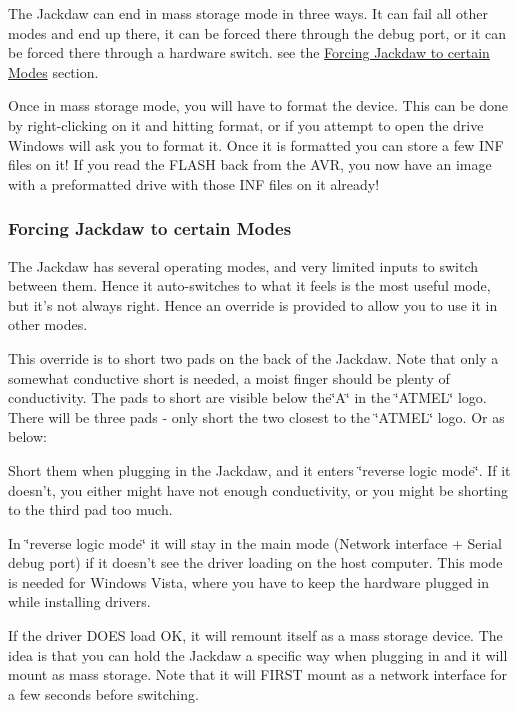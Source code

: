 \-The \-Jackdaw can end in mass storage mode in three ways. \-It can fail all other modes and end up there, it can be forced there through the debug port, or it can be forced there through a hardware switch. see the \hyperlink{a00053_hardwareforce}{\-Forcing \-Jackdaw to certain \-Modes} section.

\-Once in mass storage mode, you will have to format the device. \-This can be done by right-\/clicking on it and hitting format, or if you attempt to open the drive \-Windows will ask you to format it. \-Once it is formatted you can store a few \-I\-N\-F files on it! \-If you read the \-F\-L\-A\-S\-H back from the \-A\-V\-R, you now have an image with a preformatted drive with those \-I\-N\-F files on it already!\hypertarget{a00053_hardwareforce}{}\subsubsection{\-Forcing Jackdaw to certain Modes}\label{a00053_hardwareforce}
\-The \-Jackdaw has several operating modes, and very limited inputs to switch between them. \-Hence it auto-\/switches to what it feels is the most useful mode, but it's not always right. \-Hence an override is provided to allow you to use it in other modes.

\-This override is to short two pads on the back of the \-Jackdaw. \-Note that only a somewhat conductive short is needed, a moist finger should be plenty of conductivity. \-The pads to short are visible below the\char`\"{}\-A\char`\"{} in the \char`\"{}\-A\-T\-M\-E\-L\char`\"{} logo. \-There will be three pads -\/ only short the two closest to the \char`\"{}\-A\-T\-M\-E\-L\char`\"{} logo. \-Or as below\-:



\-Short them when plugging in the \-Jackdaw, and it enters \char`\"{}reverse logic mode\char`\"{}. \-If it doesn't, you either might have not enough conductivity, or you might be shorting to the third pad too much.

\-In \char`\"{}reverse logic mode\char`\"{} it will stay in the main mode (\-Network interface + \-Serial debug port) if it doesn't see the driver loading on the host computer. \-This mode is needed for \-Windows \-Vista, where you have to keep the hardware plugged in while installing drivers.

\-If the driver \-D\-O\-E\-S load \-O\-K, it will remount itself as a mass storage device. \-The idea is that you can hold the \-Jackdaw a specific way when plugging in and it will mount as mass storage. \-Note that it will \-F\-I\-R\-S\-T mount as a network interface for a few seconds before switching.


